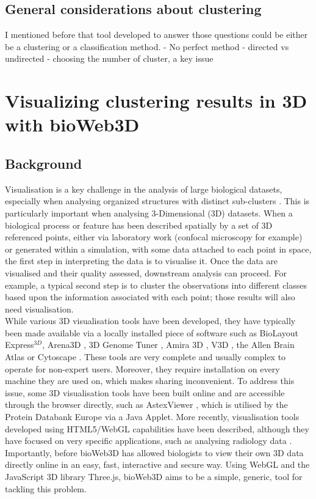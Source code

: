 	\subsection{General considerations about clustering}
	I mentioned before that tool developed to answer those questions could be either be a clustering or a classification method. 
    - No perfect method
    - directed vs undirected
    - choosing the number of cluster, a key issue

\section{Visualizing clustering results in 3D with bioWeb3D}
	\subsection{Background}

Visualisation is a key challenge in the analysis of large biological datasets, especially when analysing organized structures with distinct sub-clusters \cite{Rubel10}. This is particularly important when analysing 3-Dimensional (3D) datasets. When a biological process or feature has been described spatially by a set of 3D referenced points, either via laboratory work (confocal microscopy for example) or generated within a simulation, with some data attached to each point in space, the first step in interpreting the data is to visualise it. Once the data are visualised and their quality assessed, downstream analysis can proceed. For example, a typical second step is to cluster the observations into different classes based upon the information associated with each point; those results will also need visualisation. \\

While various 3D visualisation tools have been developed, they have typically been made available via a locally installed piece of software such as BioLayout Express$^{3D}$\cite{Freeman07}, Arena3D \cite{Pavlopoulos08},  3D Genome Tuner \cite{Wang093D}, Amira 3D \cite{Stalling05}, V3D \cite{Peng10}, the Allen Brain Atlas \cite{Lein07} or Cytoscape \cite{Shannon03}. These tools are very complete and usually complex to operate for non-expert users. Moreover, they require installation on every machine they are used on, which makes sharing inconvenient. To address this issue, some 3D visualisation tools have been built online and are accessible through the browser directly, such as AstexViewer \cite{Hartshorn02}, which is utilised by the Protein Databank Europe via a Java Applet. More recently, visualisation tools developed using HTML5/WebGL capabilities have been described, although they have focused on very specific applications, such as analysing radiology data  \cite{Dinesh12}.\\
Importantly, before bioWeb3D \cite{Pettit13} has allowed biologists to view their own 3D data directly online in an easy, fast, interactive and secure way. Using WebGL and the JavaScript 3D library Three.js, bioWeb3D aims to be a simple, generic, tool for tackling this problem.\\

